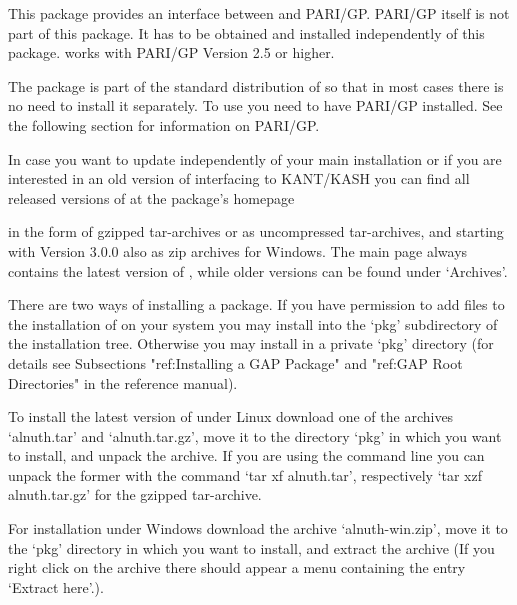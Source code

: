 

This package provides an interface between {\GAP} and PARI/GP. 
PARI/GP itself is not part of this package.  It has to be obtained and
installed independently of this package. {\Alnuth} works with PARI/GP
Version 2.5 or higher.


The package {\Alnuth} is part of the standard distribution of {\GAP} so that
in most cases there is no need to install it separately. To use {\Alnuth}
you need to have PARI/GP installed. See the following section for
information on PARI/GP.

In case you want to update {\Alnuth} independently of your main {\GAP}
installation or if you are interested in an old version of {\Alnuth}
interfacing to KANT/KASH you can find all released versions of {\Alnuth}
at the package's homepage

in the form of gzipped tar-archives or as uncompressed tar-archives,
and starting with Version 3.0.0 also as zip archives for Windows. The
main page always contains the latest version of {\Alnuth}, while older
versions can be found under `Archives'.

There are two ways of installing a {\GAP} package. If you have
permission to add files to the installation of {\GAP} on your system
you may install {\Alnuth} into the `pkg' subdirectory of the {\GAP}
installation tree. Otherwise you may install {\Alnuth} in a private
`pkg' directory (for details see Subsections "ref:Installing a GAP
Package" and "ref:GAP Root Directories" in the {\GAP} reference manual).

To install the latest version of {\Alnuth} under Linux download one of
the archives `alnuth.tar' and `alnuth.tar.gz', move it to the
directory `pkg' in which you want to install, and unpack the
archive. If you are using the command line you can unpack the former
with the command `tar xf alnuth.tar', respectively `tar xzf
alnuth.tar.gz' for the gzipped tar-archive.

For installation under Windows download the archive `alnuth-win.zip',
move it to the `pkg' directory in which you want to install, and
extract the archive (If you right click on the archive there should
appear a menu containing the entry `Extract here'.).

 
